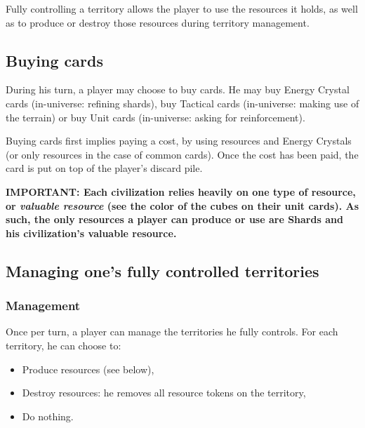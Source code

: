 \documentclass[a4paper]{article}
\begin{document}
    Fully controlling a territory allows the player to use the resources it holds,
    as well as to produce or destroy those resources during territory management.
  
  
  \subsection{Buying cards}

    During his turn, a player may choose to buy cards.
    He may buy Energy Crystal cards (in-universe: refining shards),
    buy Tactical cards (in-universe: making use of the terrain)
    or buy Unit cards (in-universe: asking for reinforcement).
    
    Buying cards first implies paying a cost, by using resources and Energy Crystals
    (or only resources in the case of common cards).
    Once the cost has been paid, the card is put on top of the player's discard pile.
    
    \hspace{-2em} \textbf{IMPORTANT:
    Each civilization relies heavily on one type of resource, or
    \textit{valuable resource} (see the color of the cubes on their unit cards).
    As such, the only resources a player can produce or use are Shards and
    his civilization's valuable resource.
    }


\newpage
  \subsection{Managing one's fully controlled territories}
    \subsubsection{Management}
    \vspace{-1em}
    Once per turn, a player can manage the territories he fully controls.
    For each territory, he can choose to:
    \vspace{-1.3em}
    \begin{itemize}
        \item Produce resources (see below),
        \item Destroy resources: he removes all resource tokens on the territory,
        \item Do nothing.
    \end{itemize}
  
\end{document}
